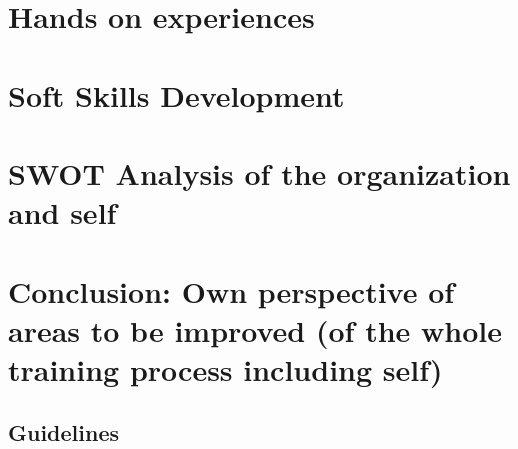 \documentclass[a4paper,12pt]{report}%
\begin{document}
\chapter{Hands on experiences}

\chapter{Soft Skills Development}

\chapter{SWOT Analysis of the organization and self}

\chapter{Conclusion: Own perspective of areas to be improved (of the whole training process including self)}


\begin{appendices}
	\chapter{Guidelines}
\end{appendices}




\end{document}
